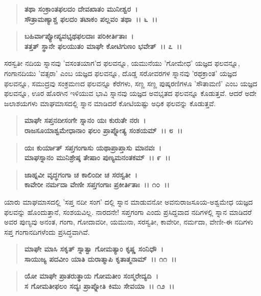 \begin{verse}
\textbf{ತಥಾ ಸಂಕ್ರಾಂತಫಲದಂ ದೇವಖಾತಂ ಮುನೀಶ್ವರ~।}\\\textbf{ಸೌತ್ರಾಮಣ್ಯಾಶ್ಚ ಫಲದಂ ತಟಾಕಂ ಪಲ್ಲವಂ ತಥಾ~।। ೬~।।} 
\end{verse}

\begin{verse}
\textbf{ಬಹಿರ್ವಾಪ್ಯೋಪ್ಯವಭೃಥಫಲದಾಃ ಪರಿಕೀರ್ತಿತಾಃ~।}\\\textbf{ತತ್ತತ್ ಸ್ಥಾನೇ ಫಲಯುತಂ ಮಾಘೇ ಕೋಟಿಗುಣಂ ಭವೇತ್~।। ೭~।।}
\end{verse}

ಸರಸ್ವತೀ ನದಿಯ ಸ್ನಾನವು 'ವಸಂತಯಾಗ'ದ ಫಲವನ್ನೂ, ಯಮುನೆಯು 'ಗೋಮೇಧ' ಯಜ್ಞದ ಫಲವನ್ನೂ, ಗಂಗಾನದಿಯು 'ವತ್ಸರಾ' ಎಂಬ ಯಜ್ಞದ ಫಲವನ್ನೂ, ದೊಡ್ಡ ಸರೋವರಗಳ ಸ್ನಾನವು 'ರಥಕ್ರಾಂತ' ಯಜ್ಞದ ಫಲವನ್ನೂ, ಸಮುದ್ರವು ಸಂಕ್ರಮಣದ ಫಲವನ್ನೂ ಕೆರೆಗಳು, ಸಣ್ಣ ಸಣ್ಣ ಪುಷ್ಕರಣಿಗಳೂ 'ಸೌತಾಮಣಿ' ಎಂಬ ಯಜ್ಞದ ಫಲವನ್ನೂ, ಊರ ಹೊರಗಿನ ಇಳಿಯುವ ಭಾವಿ ಸ್ನಾನವು ಯಜ್ಞದ ಅವಭೃತದ ಫಲವನ್ನೂ ಕೊಡುತ್ತವೆ. ಆದರೆ ಅದೇ ಜಲಾಶಯಗಳು ಮಾಘಮಾಸದಲ್ಲಿ ಸ್ನಾನ ಮಾಡಿದರೆ ಕೋಟಿಯಷ್ಟು ಅಧಿಕ ಫಲವನ್ನು ಕೊಡುತ್ತವೆ.

\begin{verse}
\textbf{ಮಾಘೇ ಸಪ್ತನದೀಸಂಗೇ ಸ್ನಾನಂ ಯಃ ಕುರುತೇ ನರಃ~।}\\\textbf{ರಾಜಸೂಯಾಶ್ವಮೇಧಾನಾಂ ಫಲಂ ಪ್ರಾಪ್ನೋತ್ಯ ಸಂಶಯಮ್~।। ೮~।। }
\end{verse}

\begin{verse}
\textbf{ಯಃ ಕುರ್ಯಾತ್ ಸಪ್ತಗಂಗಾಸು ಯಥಾಪ್ರಾಪ್ತಾಸು ಮಾನವಃ~।}\\\textbf{ಮಾಘಸ್ನಾನಂ ಮುನಿಶ್ರೇಷ್ಠ ತೇಷಾಂ ಪುಣ್ಯಮನಂತಕಮ್~।। ೯~।। }
\end{verse}

\begin{verse}
\textbf{ಜಾಹ್ನವೀ ವೃದ್ಧಗಂಗಾ ಚ ಕಾಲಿಂದೀ ಚ ಸರಸ್ವತೀ~।}\\\textbf{ಕಾವೇರೀ ನರ್ಮದಾ ವೇಣೀ ಸಪ್ತಗಂಗಾಃ ಪ್ರಕೀರ್ತಿತಾಃ~।। ೧೦~।।}
\end{verse}

ಯಾರು ಮಾಘಮಾಸದಲ್ಲಿ 'ಸಪ್ತ ನದೀ ಸಂಗ' ದಲ್ಲಿ ಸ್ನಾನ ಮಾಡುವನೋ ಅವನು\break ರಾಜಸೂಯ-ಅಶ್ವಮೇಧ ಯಜ್ಞದ ಫಲವನ್ನು ಹೊಂದುತ್ತಾನೆ, ಸಂಶಯವಿಲ್ಲ. ನಾರದನೇ! ಸಪ್ತಗಂಗಾ ಎಂದು ಪ್ರಸಿದ್ದವಾದ ನದಿಗಳಲ್ಲಿ ಸ್ನಾನ ಮಾಡಿದರೆ ಅವರ ಪುಣ್ಯವು ಅನಂತ, ಗಂಗಾ, ಗೋದಾವರೀ, ಯಮುನಾ, ಸರಸ್ವತೀ, ಕಾವೇರೀ, ನರ್ಮದಾ, ವೇಣೀ-ಈ ನದಿಗಳು ಸಪ್ತ ಗಂಗಾನದಿಗಳೆಂದು ಪ್ರಸಿದ್ಧವಾಗಿವೆ.

\begin{verse}
\textbf{ಮಾಘೇ ಮಾಸಿ ಸಕೃತ್ ಸ್ನಾತ್ವಾ ಗೋಮತ್ಯಾಂ ಕೃಷ್ಣ ಸಂನಿಧೌ~।}\\\textbf{ಸಾಯುಜ್ಯ ಪದವೀಂ ಯಾತಿ ದುರಾತ್ಮಾಪಿ ಕೃತಾತ್ಮನಾಮ್~।। ೧೧~।। }
\end{verse}

\begin{verse}
\textbf{ಯೋ ಮಾಘೇ ಪ್ರಾತರುತ್ಥಾಯ ಗೋಮತೀಂ ಸಂಸ್ಮರೇದ್ಯದಿ~।}\\\textbf{ಸ ಗೋಮತೀಫಲಂ ಸದ್ಯಃ ಪ್ರಾಪ್ನೋತಿ ಕಿಮು ಸೇವಯಾ~।। ೧೨~।।} 
\end{verse}


